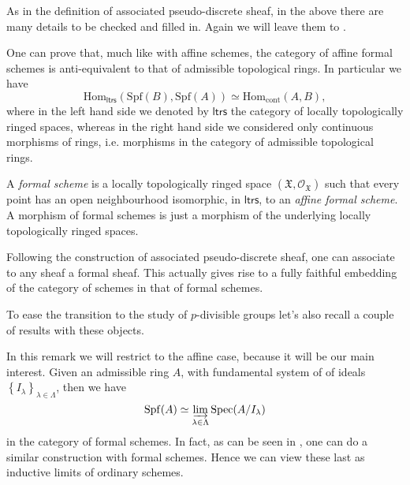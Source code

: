 \begin{rem}[]
	As in the definition of associated pseudo-discrete sheaf, in the above
	there are many details to be checked and filled in.
	Again we will leave them to \cite[Chapter I, \S10]{EGA}.
\end{rem}


\begin{rem}[]\label{EquivalenceFormalAffineSchemes}
	One can prove that, much like with affine schemes, the category of affine
	formal schemes is anti-equivalent to that of admissible topological rings.
	In particular we have
	\begin{equation*}
	\mathrm{Hom}_{\mathsf{ltrs}} \left( \mathrm{Spf}(B), \mathrm{Spf}(A) \right) \simeq
	\mathrm{Hom}_{ \mathrm{cont} } \left( A, B \right)
	,\end{equation*}
	where in the left hand side we denoted by $\mathsf{ltrs}$ the category of
	locally topologically ringed spaces, whereas in the right hand side
	we considered only continuous morphisms of rings, i.e. morphisms
	in the category of admissible topological rings.
\end{rem}


\begin{defn}
	A {\em formal scheme} is a locally topologically ringed space 
	$( \mathfrak{X} , \mathcal{O}_{ \mathfrak{X} } )$
	such that every point has an open neighbourhood isomorphic,
	in $\mathsf{ltrs}$, to an {\em affine formal scheme}.
	A morphism of formal schemes is just a morphism of the underlying
	locally topologically ringed spaces.
\end{defn}


\begin{rem}[]
	Following the construction of associated pseudo-discrete sheaf,
	one can associate to any sheaf a formal sheaf.
	This actually gives rise to a fully faithful embedding of the category of schemes
	in that of formal schemes.
\end{rem}


\noindent
To ease the transition to the study of $p$-divisible groups
let's also recall a couple of results with these objects.
\begin{rem}[]
	In this remark we will restrict to the affine case, because it will be
	our main interest.
	Given an admissible ring $A$, with fundamental system of
	of ideals $\left\{ I_\lambda \right\}_{\lambda \in \Lambda}$, then
	we have
	\begin{equation*}
	\mathrm{Spf}(A) \simeq \varinjlim_{\lambda \in \Lambda} \mathrm{Spec}(A/I_\lambda)
	\end{equation*}
	in the category of formal schemes.
	In fact, as can be seen in \cite[Chapter I, \S10.6]{EGA}, one can do a similar construction
	with formal schemes.
	Hence we can view these last as inductive limits of ordinary schemes.
\end{rem}


